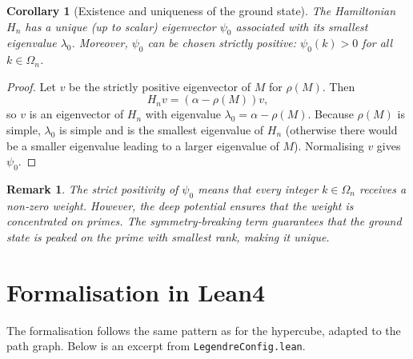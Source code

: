 \documentclass[11pt,a4paper]{article}
\newtheorem{corollary}[theorem]{Corollary}
\newtheorem{remark}[theorem]{Remark}
\begin{document}
\begin{corollary}[Existence and uniqueness of the ground state]
The Hamiltonian $H_n$ has a unique (up to scalar) eigenvector $\psi_0$ associated with its smallest eigenvalue $\lambda_0$. Moreover, $\psi_0$ can be chosen strictly positive: $\psi_0(k) > 0$ for all $k\in\Omega_n$.
\end{corollary}
\begin{proof}
Let $v$ be the strictly positive eigenvector of $M$ for $\rho(M)$. Then
\[
H_n v = (\alpha - \rho(M)) v,
\]
so $v$ is an eigenvector of $H_n$ with eigenvalue $\lambda_0 = \alpha - \rho(M)$. Because $\rho(M)$ is simple, $\lambda_0$ is simple and is the smallest eigenvalue of $H_n$ (otherwise there would be a smaller eigenvalue leading to a larger eigenvalue of $M$). Normalising $v$ gives $\psi_0$.
\end{proof}

\begin{remark}
The strict positivity of $\psi_0$ means that every integer $k\in\Omega_n$ receives a non‑zero weight. However, the deep potential ensures that the weight is concentrated on primes. The symmetry‑breaking term guarantees that the ground state is peaked on the prime with smallest rank, making it unique.
\end{remark}

\section{Formalisation in Lean4}

The formalisation follows the same pattern as for the hypercube, adapted to the path graph. Below is an excerpt from \texttt{LegendreConfig.lean}.
\end{document}
